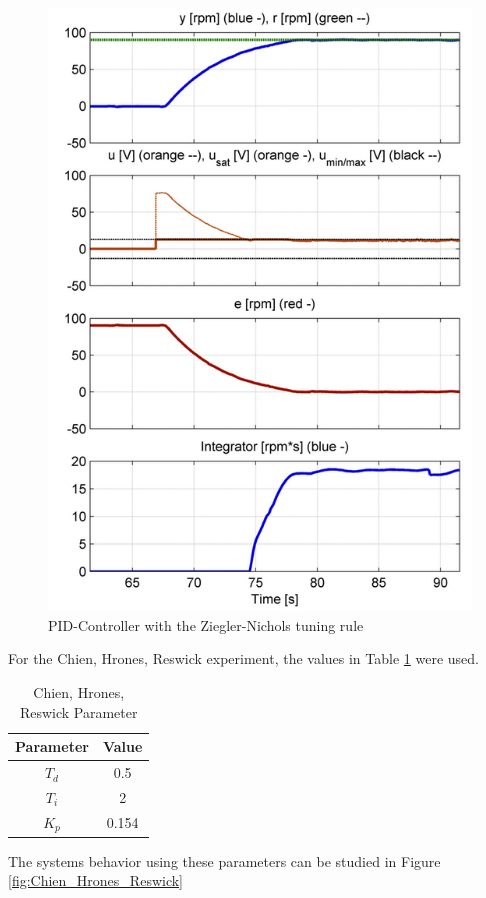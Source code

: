 \begin{figure}[H]
\begin{center}
\includegraphics[width=0.5\linewidth]{images/general/PID/Ziegler_nichols}
\end{center}
\caption{PID-Controller with the Ziegler-Nichols tuning rule}
\label{fig:Ziegler_nichols}
\end{figure}

For the Chien, Hrones, Reswick experiment, the values in Table \ref{tab:chr_params} were used.

\begin{table}[H]
\begin{center}
\begin{tabular}{ |c|c| }
 \hline
 Parameter & Value\\
 \hline
 $T_{d}$ & 0.5\\
 \hline
 $T_{i}$ & 2\\
 \hline
 $K_{p}$ & 0.154\\
 \hline
\end{tabular}
\end{center}
\caption{Chien, Hrones, Reswick Parameter}
\label{tab:chr_params}
\end{table}

The systems behavior using these parameters can be studied in Figure \ref{fig:Chien_Hrones_Reswick}

